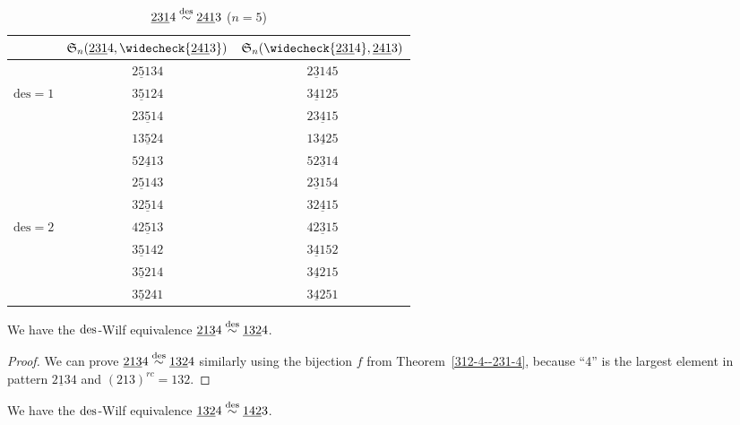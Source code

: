 \begin{table}[h]
\setlength{\tabcolsep}{15pt}%
  \renewcommand{\arraystretch}{1.2}
  \centering
  \begin{tabular}{ccc} 
      &  $\S_n(\underline{231}4,\widecheck{\underline{241}3})$ & $\S_n(\widecheck{\underline{231}4},\underline{241}3)$ \\ \hline
       & $\underline{251}34$ & $\underline{231}45$  \\
   $\mathrm{des}=1$    & $\underline{351}24$ & $\underline{341}25$  \\
       & $2\underline{351}4$ & $2\underline{341}5$  \\
       & $1\underline{352}4$ & $1\underline{342}5$  \\\hline
       & $5\underline{241}3$ & $5\underline{231}4$   \\
       & $\underline{251}43$ &  $\underline{231}54$ \\
       &  $3\underline{251}4$ &  $3\underline{241}5$ \\
        $\mathrm{des}=2$ & $4\underline{251}3$ &  $4\underline{231}5$ \\
       & $\underline{351}42$ & $\underline{341}52$  \\
       & $\underline{352}14$ & $\underline{342}15$  \\
       & $\underline{352}41$ & $\underline{342}51$  \\      
       \hline
  \end{tabular}
  \caption{$\underline{231}4\overset{\mathrm{des}}{\sim} \underline{241}3$ ($n=5$)}
  \label{tab:231-4--241-3}
\end{table}

\begin{theorem} \label{213-4--132-4}
  We have the $\mathrm{des}$-Wilf equivalence $\underline{213}4\overset{\mathrm{des}}{\sim }\underline{132}4$.
\end{theorem}

\begin{proof}
  We can prove $\underline{213}4\overset{\mathrm{des}}{\sim }\underline{132}4$ similarly using 
  the bijection $f$ from Theorem~\ref{312-4--231-4}, because ``4'' is the largest element in pattern
  $\underline{213}4$ and $(213)^{rc}=132$.
\end{proof}

\begin{theorem}
  We have the $\mathrm{des}$-Wilf equivalence $\underline{132}4\overset{\mathrm{des}}{\sim }\underline{142}3$. \label{132-4--142-3}
\end{theorem}

